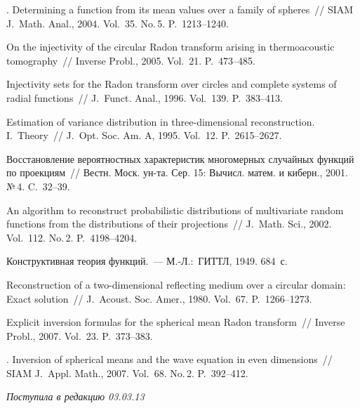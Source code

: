 \begin{multicols}{2}
{{\begin{thebibliography}{99}
. Determining a function from
its mean values over a family of spheres~// SIAM J.~Math. Anal.,
2004. Vol.~35. No.\,5. P.~1213--1240.

 On the injectivity of the
circular Radon transform arising in thermoacoustic tomography~//
Inverse Probl., 2005. Vol.~21. P.~473--485.
{

}



 Injectivity sets for the
Radon transform over circles and complete systems of radial
functions~// J.~Funct. Anal., 1996. Vol.~139. P.~383--413.

 Estimation of variance distribution in
three-dimensional reconstruction. I.~Theory~// J.~Opt. Soc. Am. A,
1995. Vol.~12. P.~2615--2627.

 Восстановление вероятностных
характеристик многомерных случайных функций по проекциям~// Вестн.
Моск. ун-та. Сер. 15: Вычисл. матем. и киберн., 2001. №\,4.
C.~32--39.
{

}

 An algorithm to reconstruct
probabilistic distributions of multivariate random functions from
the distributions of their projections~// J.~Math. Sci., 2002.
Vol.~112. No.\,2. P.~4198--4204.

 Конструктивная теория функций.~--- М.-Л.:~ГИТТЛ, 1949. 684~с.

 Reconstruction of a two-dimensional
reflecting medium over a circular domain: Exact solution~// 
J.~Acoust. Soc. Amer., 1980. Vol.~67. P.~1266--1273.

 Explicit inversion formulas for the
spherical mean Radon transform~// Inverse Probl., 2007. Vol.~23.
P.~373--383.

. Inversion of spherical
means and the wave equation in even dimensions~// SIAM J.~Appl.
Math., 2007. Vol.~68. No.\,2. P.~392--412.
\end{thebibliography} } }



\end{multicols}

\hfill{\small\textit{Поступила в редакцию 03.03.13}}


